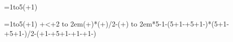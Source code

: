 \long{}
\def\fornum#1=#2to#3(#4){%
	\edef#1{\number\numexpr#2}\edef\fornumtemp{\noexpand\fornumi\expandafter\noexpand\csname fornum\string#1\endcsname
		{\number\numexpr#3}{\ifnum\numexpr#4<0 <\else>\fi}{\number\numexpr#4}\noexpand#1}\fornumtemp
}
\long{}
\def\elem(#1,#2){\numexpr(#1+#2)*(#1+#2-1)/2-(\ifodd\numexpr#1+#2\relax#1\else#2\fi)\relax}
\def\zzmat#1{%
	\noindent%
	\fornum\yy=1to#1(+1){%
		\fornum\xx=1to#1(+1){%
			\ifnum\numexpr\xx+\yy\relax<\numexpr#1+2\relax
				\hbox to 2em{\hfil\number\elem(\xx,\yy)}%
			\else
				\hbox to 2em{\hfil\number\numexpr#1*#1-1-\elem(#1+1-\xx,#1+1-\yy)\relax}%
			\fi
		}%
		\par\noindent%
	}\par
}
\zzmat{5}
\bye
